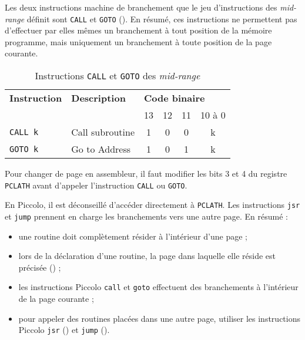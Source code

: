Les deux instructions machine de branchement que le jeu d'instructions des \emph{mid-range} définit sont \texttt{CALL} et \texttt{GOTO} (). En résumé, ces instructions ne permettent pas d'effectuer par elles mêmes un branchement à tout position de la mémoire programme, mais uniquement un branchement à toute position de la page courante.

\begin{table}[!ht]
  \centering
  \small
  \begin{tabular}{llcccc}
    \textbf{Instruction} & \textbf{Description} & \multicolumn{4}{l}{\bf Code binaire}\\
                         &                      & 13 & 12 & 11 & 10 à 0\\
    \hline
    \texttt{CALL k}  & Call subroutine & 1 & 0 & 0 & k \\
    \texttt{GOTO k}  & Go to Address   & 1 & 0 & 1 & k \\
    \hline
  \end{tabular}
  \caption{Instructions \texttt{CALL} et \texttt{GOTO} des \emph{mid-range}}
\end{table}



Pour changer de page en assembleur, il faut modifier les bits 3 et 4 du registre \texttt{PCLATH} avant d'appeler l'instruction \texttt{CALL} ou \texttt{GOTO}.

En Piccolo, il est déconseillé d'accéder directement à \texttt{PCLATH}. Les instructions \texttt{jsr} et \texttt{jump} prennent en charge les branchements vers une autre page. En résumé :
\begin{itemize}
  \item une routine doit complètement résider à l'intérieur d'une page ;
  \item lors de la déclaration d'une routine, la page dans laquelle elle réside est précisée () ;
  \item les instructions Piccolo \texttt{call} et \texttt{goto} effectuent des branchements à l'intérieur de la page courante ;
  \item pour appeler des routines placées dans une autre page, utiliser les instructions Piccolo \texttt{jsr} () et \texttt{jump} ().
\end{itemize}



